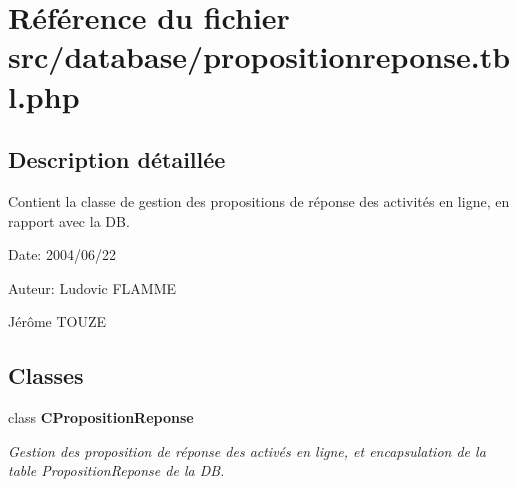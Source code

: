 \section{Référence du fichier src/database/propositionreponse.tbl.php}
\label{propositionreponse_8tbl_8php}


\subsection{Description détaillée}
Contient la classe de gestion des propositions de réponse des activités en ligne, en rapport avec la DB. 

\begin{Desc}
\item[Date:]2004/06/22\end{Desc}
\begin{Desc}
\item[Auteur:]Ludovic FLAMME 

Jérôme TOUZE \end{Desc}


\subsection*{Classes}
\begin{CompactItemize}
\item 
class {\bf CPropositionReponse}
\begin{CompactList}\small\item\em Gestion des proposition de réponse des activés en ligne, et encapsulation de la table PropositionReponse de la DB. \item\end{CompactList}\end{CompactItemize}
